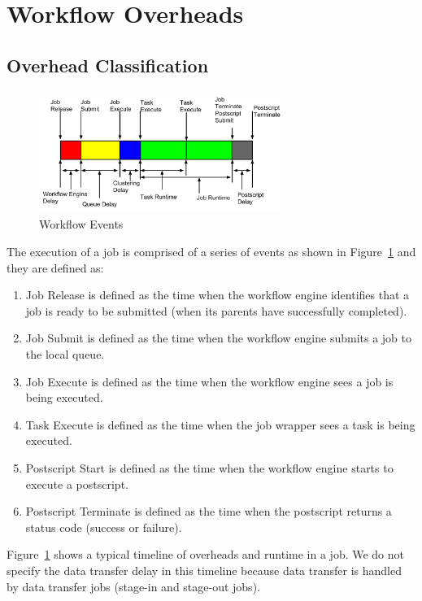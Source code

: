 \section{Workflow Overheads}
\subsection{Overhead Classification}


\begin{figure}[h!]
	\centering
    \includegraphics[width=0.7\textwidth]{figures/model/Job_Timeline.pdf}
    \caption{Workflow Events}
    \label{fig:model_overhead}
\end{figure}


The execution of a job is comprised of a series of events as shown in Figure~\ref{fig:model_overhead} and they are defined as:
\begin{enumerate}
\item Job Release is defined as the time when the workflow engine identifies that a job is ready to be submitted (when its parents have successfully completed). 
\item Job Submit is defined as the time when the workflow engine submits a job to the local queue. 
\item Job Execute is defined as the time when the workflow engine sees a job is being executed. 
\item Task Execute is defined as the time when the job wrapper sees a task is being executed. 

\item Postscript Start is defined as the time when the workflow engine starts to execute a postscript. 
\item Postscript Terminate is defined as the time when the postscript returns a status code (success or failure). 
\end{enumerate}

Figure~\ref{fig:model_overhead} shows a typical timeline of overheads and runtime in a job. We do not specify the data transfer delay in this timeline because data transfer is handled by data transfer jobs (stage-in and stage-out jobs). 

